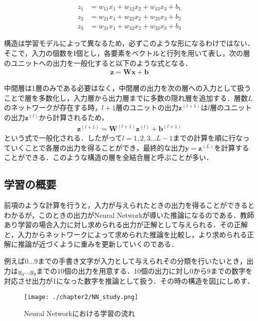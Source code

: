 \begin{align*}
z_{1} &= w_{11}x_{1} + w_{12}x_{2} + w_{13}x_{3} + b_1\\
z_{2} &= w_{21}x_{1} + w_{22}x_{2} + w_{23}x_{3} + b_2\\
z_{3} &= w_{31}x_{1} + w_{32}x_{2} + w_{33}x_{3} + b_3
\end{align*}

構造は学習モデルによって異なるため，必ずこのような形になるわけではない．そこで，入力の個数をI個とし，各要素をベクトルと行列を用いて表し，次の層のユニットへの出力を一般化すると以下のような式となる．
\begin{align*}
\bm{z} = \bm{W}\bm{x} + \bm{b}
\end{align*}

中間層は1層のみである必要はなく，中間層の出力を次の層への入力として扱うことで層を多数化し，入力層から出力層までに多数の隠れ層を追加する．層数$L$のネットワークが存在する時，$l+1$層のユニットの出力$\bm{z}^{(l+1)}$は$l$層のユニットの出力$\bm{z}^{(l)}$から計算されるため，
\begin{align*}
\bm{z}^{(l+1)} = \bm{W}^{(l+1)}\bm{z}^{(l)} + \bm{b}^{(l+1)}
\end{align*}
という式で一般化される．したがって$l=1,2,3\ldots L-1$までの計算を順に行なっていくことで各層の出力を得ることができ，最終的な出力$\bm{y}=\bm{z}^{(L)}$を計算することができる．このような構造の層を全結合層と呼ぶことが多い．


\subsection{学習の概要}
前項のような計算を行うと，入力が与えられたときの出力を得ることができるとわかるが，このときの出力がNeural Networkが導いた推論になるのである．教師あり学習の場合入力に対し求められる出力が正解として与えられる．その正解と，入力からネットワークによって求められた推論を比較し，より求められる正解に推論が近づくように重みを更新していくのである．

例えば$0 \ldots 9$までの手書き文字が入力として与えられその分類を行いたいとき，出力は$y_0 \ldots y_9$までの10個の出力を用意する．10個の出力に対し0から9までの数字を対応させ出力が1になった数字を推論として扱う．その時の構造を図\ref{fig_study}にしめす．
\begin{figure}[]
  \begin{center}
    \texttt{[image: ./chapter2/NN\_study.png]}
    \caption{Neural Networkにおける学習の流れ}
    \label{fig_study}
  \end{center}
\end{figure}

